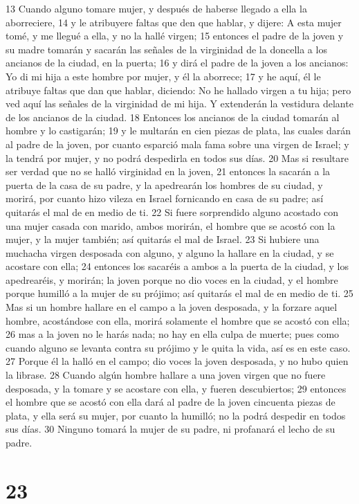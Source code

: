 13 Cuando alguno tomare mujer, y después de haberse llegado a ella la aborreciere,
14 y le atribuyere faltas que den que hablar, y dijere: A esta mujer tomé, y me llegué a ella, y no la hallé virgen;
15 entonces el padre de la joven y su madre tomarán y sacarán las señales de la virginidad de la doncella a los ancianos de la ciudad, en la puerta;
16 y dirá el padre de la joven a los ancianos: Yo di mi hija a este hombre por mujer, y él la aborrece;
17 y he aquí, él le atribuye faltas que dan que hablar, diciendo: No he hallado virgen a tu hija; pero ved aquí las señales de la virginidad de mi hija. Y extenderán la vestidura delante de los ancianos de la ciudad.
18 Entonces los ancianos de la ciudad tomarán al hombre y lo castigarán;
19 y le multarán en cien piezas de plata, las cuales darán al padre de la joven, por cuanto esparció mala fama sobre una virgen de Israel; y la tendrá por mujer, y no podrá despedirla en todos sus días.
20 Mas si resultare ser verdad que no se halló virginidad en la joven,
21 entonces la sacarán a la puerta de la casa de su padre, y la apedrearán los hombres de su ciudad, y morirá, por cuanto hizo vileza en Israel fornicando en casa de su padre; así quitarás el mal de en medio de ti.
22 Si fuere sorprendido alguno acostado con una mujer casada con marido, ambos morirán, el hombre que se acostó con la mujer, y la mujer también; así quitarás el mal de Israel.
23 Si hubiere una muchacha virgen desposada con alguno, y alguno la hallare en la ciudad, y se acostare con ella;
24 entonces los sacaréis a ambos a la puerta de la ciudad, y los apedrearéis, y morirán; la joven porque no dio voces en la ciudad, y el hombre porque humilló a la mujer de su prójimo; así quitarás el mal de en medio de ti.
25 Mas si un hombre hallare en el campo a la joven desposada, y la forzare aquel hombre, acostándose con ella, morirá solamente el hombre que se acostó con ella;
26 mas a la joven no le harás nada; no hay en ella culpa de muerte; pues como cuando alguno se levanta contra su prójimo y le quita la vida, así es en este caso.
27 Porque él la halló en el campo; dio voces la joven desposada, y no hubo quien la librase.
28 Cuando algún hombre hallare a una joven virgen que no fuere desposada, y la tomare y se acostare con ella, y fueren descubiertos;
29 entonces el hombre que se acostó con ella dará al padre de la joven cincuenta piezas de plata, y ella será su mujer, por cuanto la humilló; no la podrá despedir en todos sus días. 
30 Ninguno tomará la mujer de su padre, ni profanará el lecho de su padre.

\chapter{23}


